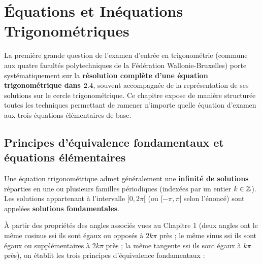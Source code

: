 \chapter{Équations et Inéquations Trigonométriques}

La première grande question de l'examen d'entrée en trigonométrie (commune aux quatre facultés polytechniques de la Fédération Wallonie-Bruxelles) porte systématiquement sur la \textbf{résolution complète d'une équation trigonométrique dans $2.4$}, souvent accompagnée de la représentation de ses solutions sur le cercle trigonométrique. Ce chapitre expose de manière structurée toutes les techniques permettant de ramener n'importe quelle équation d'examen aux trois équations élémentaires de base.

\section{Principes d'équivalence fondamentaux et équations élémentaires}

Une équation trigonométrique admet généralement une \textbf{infinité de solutions} réparties en une ou plusieurs familles périodiques (indexées par un entier $k \in \mathbb{Z}$). Les solutions appartenant à l'intervalle $[0, 2\pi[$ (ou $[-\pi, \pi[$ selon l'énoncé) sont appelées \textbf{solutions fondamentales}.

À partir des propriétés des angles associés vues au Chapitre 1 (deux angles ont le même cosinus ssi ils sont égaux ou opposés à $2k\pi$ près ; le même sinus ssi ils sont égaux ou supplémentaires à $2k\pi$ près ; la même tangente ssi ils sont égaux à $k\pi$ près), on établit les trois principes d'équivalence fondamentaux :

